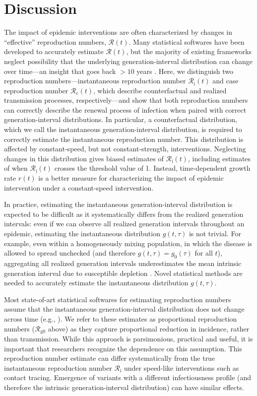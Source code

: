 \documentclass[12pt]{article}
\newcommand{\Rx}[1]{\ensuremath{{\mathcal R}_{#1}}\xspace}
\newcommand{\Rc}{\Rx{\mathrm{c}}}
\newcommand{\Ri}{\Rx{\mathrm{i}}}
\newcommand{\RR}{\ensuremath{{\mathcal R}}\xspace}
\newcommand{\Rcori}{\Rx{\mathrm{g0}}}
\begin{document}
\section{Discussion}

The impact of epidemic interventions are often characterized by changes in ``effective'' reproduction numbers, $\RR(t)$.
Many statistical softwares have been developed to accurately estimate $\RR(t)$, but the majority of existing frameworks neglect possibility that the underlying generation-interval distribution can change over time---an insight that goes back $>10$ years \citep{fraser2007estimating}.
Here, we distinguish two reproduction numbers---instantaneous reproduction number $\Ri(t)$ and case reproduction number $\Rc(t)$, which describe counterfactual and realized transmission processes, respectively---and show that both reproduction numbers can correctly describe the renewal process of infection when paired with correct generation-interval distributions.
In particular, a counterfactual distribution, which we call the instantaneous generation-interval distribution, is required to correctly estimate the instantaneous reproduction number. 
This distribution is affected by constant-speed, but not constant-strength, interventions.
Neglecting changes in this distribution gives biased estimates of $\Ri(t)$, including estimates of when $\Ri(t)$ crosses the threshold value of 1.
Instead, time-dependent growth rate $r(t)$ is a better measure for characterizing the impact of epidemic intervention under a constant-speed intervention.

In practice, estimating the instantaneous generation-interval distribution is expected to be difficult as it systematically differs from the realized generation intervals: even if we can observe all realized generation intervals throughout an epidemic, estimating the instantaneous distribution $g(t, \tau)$ is not trivial.
For example, even within a homogeneously mixing population, in which the disease is allowed to spread unchecked (and therefore $g(t, \tau) = g_0(\tau)$ for all $t$), aggregating all realized generation intervals underestimates the mean intrinsic generation interval due to susceptible depletion \citep{park2020inferring}.
Novel statistical methods are needed to accurately estimate the instantaneous distribution $g(t, \tau)$.

Most state-of-art statistical softwares for estimating reproduction numbers assume that the instantaneous generation-interval distribution does not change across time (e.g., \citep{10.12688/wellcomeopenres.16006.2,flaxman2020estimating,brauner2021inferring}).
We refer to these estimates as proportional reproduction numbers ($\Rcori$ above) as they capture proportional reduction in incidence, rather than transmission.
While this approach is parsimonious, practical and useful, it is important that researchers recognize the dependence on this assumption.
This reproduction number estimate can differ systematically from the true instantaneous reproduction number $\Ri$ under speed-like interventions such as contact tracing.
Emergence of variants with a different infectiousness profile (and therefore the intrinsic generation-interval distribution) can have similar effects.
\end{document}
